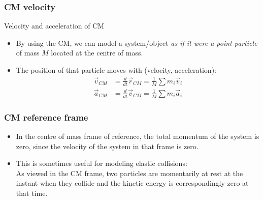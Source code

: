 \documentclass[aspectratio=169,
hyperref={colorlinks,urlcolor=blue}
]{beamer}
\begin{document}


\subsubsection{CM velocity}
\label{subsubsec:cmvelocity}
\begin{frame}{Velocity and acceleration of CM}
\begin{itemize}
\item By using the CM, we can model a system/object \textit{as if it were a point particle} of mass $M$ located at the centre of mass.
\item The position of that particle moves with (velocity, acceleration):
\begin{align*}
\vec v_{CM}&=\frac{d}{dt} \vec r_{CM}= \frac{1}{M}\sum m_i \vec v_i\\
\vec a_{CM}&=\frac{d}{dt} \vec v_{CM}=\frac{1}{M}\sum m_i \vec a_i
\end{align*}
\end{itemize}
\end{frame}


\subsubsection{CM reference frame}
\label{subsubsec:cmreferenceframe}
{
\begin{itemize}
\item In the centre of mass frame of reference, the total momentum of the system is zero, since the velocity of the system in that frame is zero.
\item This is sometimes useful for modeling elastic collisions:\\
As viewed in the CM frame, two particles are momentarily at rest at the instant when they collide and the kinetic energy is correspondingly zero at that time. 
\end{itemize}
}
{
\begin{center}
\end{center}
}
\end{document}

